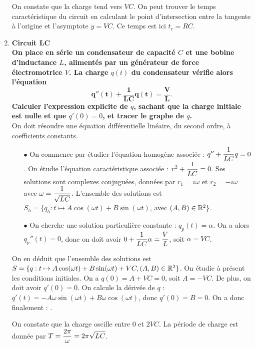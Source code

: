 \documentclass[a4paper, 11pt,reqno]{article}
\begin{document}
\begin{correction}
\begin{enumerate}
\begin{center}
\hspace*{0.5cm} \begin{minipage}[c]{0.95\linewidth}
On constate que la charge tend vers $VC$. On peut trouver le temps caract\'eristique du circuit en calculant le point d'intersection entre la tangente \`a l'origine et l'asymptote $y=VC$. Ce temps est ici $t_c = RC$.
\end{minipage}
\end{center}
\item \textbf{Circuit LC}\\
\textbf{On place en s\'erie un condensateur de capacit\'e $C$ et une bobine d'inductance $L$, aliment\'es par un g\'en\'erateur de force \'electromotrice $V$. La charge $q(t)$ du condensateur v\'erifie alors l'\'equation}
$$\mathbf{q''(t) + \frac{1}{LC} q(t) = \frac{V}{L}.}$$
\textbf{Calculer l'expression explicite de $q$, sachant que la charge initiale est nulle et que $q'(0)=0$, et tracer le graphe de $q$.}\\
On doit r\'esoudre une \'equation diff\'erentielle lin\'eaire, du second ordre, \`a coefficients constants. \\
\begin{itemize}
\item[$\bullet$] On commence par \'etudier l'\'equation homog\`ene associ\'ee : $\displaystyle q'' + \frac{1}{LC} q = 0$. On \'etudie l'\'equation caract\'eristique associ\'ee : $r^2 + \displaystyle \frac{1}{LC}=0$. Ses solutions sont complexes conjugu\'ees, donn\'ees par $r_1= i\omega$ et $r_2=-i\omega$ avec  $\omega=\displaystyle \frac{1}{\sqrt{LC}}$. L'ensemble des solutions est $ S_h = \{ q_h : t \mapsto A \cos(\omega t) + B \sin(\omega t)$, avec $(A,B) \in \mathbb{R}^2\}$.
\item[$\bullet$] On cherche une solution particuli\`ere constante : $q_p(t) = \alpha$. On a alors $q_p''(t) = 0$, donc on doit avoir $0 +\displaystyle \frac{1}{LC} \alpha = \frac{V}{L}$, soit $\alpha = VC$.
\end{itemize}
On en d\'eduit que l'ensemble des solutions est $S=\{q : t \mapsto  A \cos(\omega t) + B \sin(\omega t) + VC, (A,B) \in \mathbb{R}^2\}$. On \'etudie \`a pr\'esent les conditions initiales. On a $q(0) = A+VC = 0$, soit $A= -VC$. De plus, on doit avoir $q'(0)=0$. On calcule la d\'eriv\'ee de $q$ : $q'(t) = - A \omega \sin(\omega t) + B \omega \cos(\omega t)$, donc $q'(0) = B = 0$. On a donc finalement : .
\begin{center}
\begin{minipage}[c]{0.45\linewidth}

\end{minipage} 
\hspace*{0.5cm} \begin{minipage}[c]{0.45\linewidth}
On constate que la charge oscille entre 0 et $2VC$. La p\'eriode de charge est donn\'ee par $T = \displaystyle \frac{2\pi}{\omega} = \displaystyle  2\pi \sqrt{LC}$.
\end{minipage}
\end{center}
\end{enumerate}
\end{correction}
\end{document}
